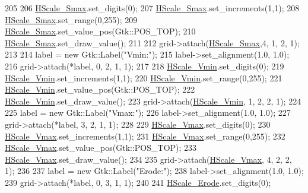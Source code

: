 \begin{DoxyCode}
205 
206     \hyperlink{class_vision_g_u_i_a147e8499bd7412fdb732103c0754f013}{HScale\_Smax}.set\_digits(0);
207     \hyperlink{class_vision_g_u_i_a147e8499bd7412fdb732103c0754f013}{HScale\_Smax}.set\_increments(1,1);
208     \hyperlink{class_vision_g_u_i_a147e8499bd7412fdb732103c0754f013}{HScale\_Smax}.set\_range(0,255);
209     \hyperlink{class_vision_g_u_i_a147e8499bd7412fdb732103c0754f013}{HScale\_Smax}.set\_value\_pos(Gtk::POS\_TOP);
210     \hyperlink{class_vision_g_u_i_a147e8499bd7412fdb732103c0754f013}{HScale\_Smax}.set\_draw\_value();
211 
212     grid->attach(\hyperlink{class_vision_g_u_i_a147e8499bd7412fdb732103c0754f013}{HScale\_Smax},4, 1, 2, 1);
213 
214     label = \textcolor{keyword}{new} Gtk::Label(\textcolor{stringliteral}{"Vmin:"});
215     label->set\_alignment(1.0, 1.0);
216     grid->attach(*label, 0, 2, 1, 1);
217 
218     \hyperlink{class_vision_g_u_i_a8a1e7f6d4357eceab8e47fe0fb523cf9}{HScale\_Vmin}.set\_digits(0);
219     \hyperlink{class_vision_g_u_i_a8a1e7f6d4357eceab8e47fe0fb523cf9}{HScale\_Vmin}.set\_increments(1,1);
220     \hyperlink{class_vision_g_u_i_a8a1e7f6d4357eceab8e47fe0fb523cf9}{HScale\_Vmin}.set\_range(0,255);
221     \hyperlink{class_vision_g_u_i_a8a1e7f6d4357eceab8e47fe0fb523cf9}{HScale\_Vmin}.set\_value\_pos(Gtk::POS\_TOP);
222     \hyperlink{class_vision_g_u_i_a8a1e7f6d4357eceab8e47fe0fb523cf9}{HScale\_Vmin}.set\_draw\_value();
223     grid->attach(\hyperlink{class_vision_g_u_i_a8a1e7f6d4357eceab8e47fe0fb523cf9}{HScale\_Vmin}, 1, 2, 2, 1);
224 
225     label = \textcolor{keyword}{new} Gtk::Label(\textcolor{stringliteral}{"Vmax:"});
226     label->set\_alignment(1.0, 1.0);
227     grid->attach(*label, 3, 2, 1, 1);
228 
229     \hyperlink{class_vision_g_u_i_ab277d08dcce9e2521b9d4c542be69247}{HScale\_Vmax}.set\_digits(0);
230     \hyperlink{class_vision_g_u_i_ab277d08dcce9e2521b9d4c542be69247}{HScale\_Vmax}.set\_increments(1,1);
231     \hyperlink{class_vision_g_u_i_ab277d08dcce9e2521b9d4c542be69247}{HScale\_Vmax}.set\_range(0,255);
232     \hyperlink{class_vision_g_u_i_ab277d08dcce9e2521b9d4c542be69247}{HScale\_Vmax}.set\_value\_pos(Gtk::POS\_TOP);
233     \hyperlink{class_vision_g_u_i_ab277d08dcce9e2521b9d4c542be69247}{HScale\_Vmax}.set\_draw\_value();
234 
235     grid->attach(\hyperlink{class_vision_g_u_i_ab277d08dcce9e2521b9d4c542be69247}{HScale\_Vmax}, 4, 2, 2, 1);
236 
237     label = \textcolor{keyword}{new} Gtk::Label(\textcolor{stringliteral}{"Erode:"});
238     label->set\_alignment(1.0, 1.0);
239     grid->attach(*label, 0, 3, 1, 1);
240 
241     \hyperlink{class_vision_g_u_i_ad4bc77416f4e50fa03a7cc7f64a2d78e}{HScale\_Erode}.set\_digits(0);

\end{DoxyCode}

